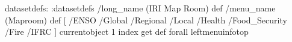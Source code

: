 \begin{ingrid}
datasetdefs:
:datasetdefs
/long_name (IRI Map Room) def
/menu_name (Maproom) def
[ /ENSO /Global /Regional /Local /Health /Food_Security /Fire /IFRC ]
{ currentobject 1 index get  def} forall
leftmenuinfotop
\end{ingrid}
